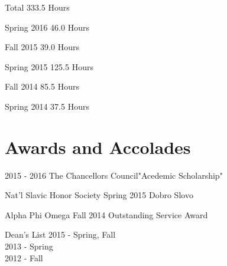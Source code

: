 \documentclass{tccv}
\begin{document}
\begin{yearlist}

\item
	[]{Total}
	{333.5 Hours}{}

\item
	[]{Spring 2016}
	{46.0 Hours}{}
	
\item
	[]{Fall 2015}
	{39.0 Hours}{}
	
\item
	[]{Spring 2015}
	{125.5 Hours}{}

\item
	[]{Fall 2014}
	{85.5 Hours}{}

\item
	[]{Spring 2014}
	{37.5 Hours}{}

\end{yearlist}

\section{Awards and Accolades}

\begin{yearlist}

\item
	[]{2015 - 2016}
	{The Chancellors Council}{"Acedemic Scholarship"}
	
\item
	[Nat'l Slavic Honor Society]{Spring 2015}
	{Dobro Slovo}{}

\item
	[Alpha Phi Omega]{Fall 2014}
	{Outstanding Service Award}{}


\end{yearlist}
\begin{factlist}

\item{Dean's List}
	{2015 - Spring, Fall\\
	2013 - Spring\\
	2012 - Fall}

\end{factlist}



%
%
%
\end{document}
